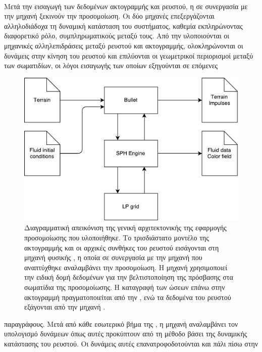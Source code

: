 \paragraph{} Μετά την εισαγωγή των δεδομένων ακτογραμμής και ρευστού, η  σε
συνεργασία με την μηχανή  ξεκινούν την προσομοίωση. Οι δύο μηχανές επεξεργάζονται
αλληλοδιάδοχα τη δυναμική κατάσταση του συστήματος, καθεμία εκπληρώνοντας διαφορετικό
ρόλο, συμπληρωματικούς μεταξύ τους. Από την  υλοποιούνται οι μηχανικές
αλληλεπιδράσεις μεταξύ ρευστού και ακτογραμμής, ολοκληρώνονται οι δυνάμεις στην κίνηση του
ρευστού και επιλύονται οι γεωμετρικοί περιορισμοί μεταξύ των σωματιδίων, οι λόγοι
εισαγωγής των οποίων εξηγούνται σε επόμενες
\begin{figure}[h!]
  \centering
  \includegraphics[width=.9\textwidth]{figures/architecture.pdf}
  \caption[Γενική αρχιτεκτονική υλοποίησης] {Διαγραμματική απεικόνιση της γενική
    αρχιτεκτονικής της εφαρμογής προσομοίωσης που υλοποιήθηκε. Το τρισδιάστατο μοντέλο της
    ακτογραμμής και οι αρχικές συνθήκες του ρευστού εισάγονται στη μηχανή φυσικής
    , η οποία σε συνεργασία με την μηχανή  που αναπτύχθηκε
    αναλαμβάνει την προσομοίωση. Η μηχανή  χρησιμοποιεί την ειδική δομή δεδομένων
     για την βελτιστοποίηση της πρόσβασης στα σωματίδια της προσομοίωσης. Η
    καταγραφή των ώσεων επάνω στην ακτογραμμή πραγματοποιείται από την , ενώ
    τα δεδομένα του ρευστού εξάγονται από την μηχανή .}
  \label{fig:architecture}
\end{figure}
παραγράφους. Μετά από κάθε εσωτερικό βήμα της , η μηχανή  αναλαμβάνει
τον υπολογισμό δυνάμεων όπως αυτές προκύπτουν από τη μέθοδο  βάσει της δυναμικής
κατάστασης του ρευστού. Οι δυνάμεις αυτές επανατροφοδοτούνται και πάλι πίσω στην
